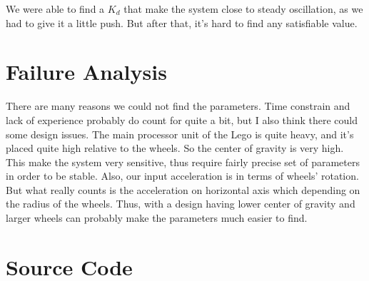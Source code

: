 \documentclass{notes}
\begin{document}
We were able to find a $K_d$ that make the system close to steady oscillation, as we had to give it a
little push. But after that, it's hard to find any satisfiable value. 


\section{Failure Analysis}

There are many reasons we could not find the parameters. Time constrain and lack of experience
probably do count for quite a bit, but I also think there could some design issues. The main
processor unit of the Lego is quite heavy, and it's placed quite high relative to the wheels. So the
center of gravity is very high. This make the system very sensitive, thus require fairly precise set
of parameters in order to be stable. Also, our input acceleration is in terms of wheels' rotation.
But what really counts is the acceleration on horizontal axis which depending on the radius of the
wheels. Thus, with a design having lower center of gravity and larger wheels can probably make the
parameters much easier to find.


\section*{Source Code}


\end{document}
